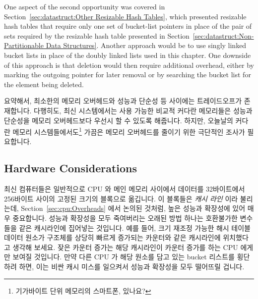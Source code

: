 One aspect of the second opportunity was covered in
Section~\ref{sec:datastruct:Other Resizable Hash Tables},
which presented resizable hash tables that require only one
set of bucket-list pointers in place of the pair of sets required
by the resizable hash table presented in
Section~\ref{sec:datastruct:Non-Partitionable Data Structures}.
Another approach would be to use singly linked bucket lists in
place of the doubly linked lists used in this chapter.
One downside of this approach is that deletion would then require
additional overhead, either by marking the outgoing pointer
for later removal
or by searching the bucket list for the element being deleted.
\fi

요약해서, 최소한의 메모리 오버헤드와 성능과 단순성 등 사이에는 트레이드오프가
존재합니다.
다행히도, 최신 시스템에서는 사용 가능한 비교적 커다란 메모리들은 성능과
단순성을 메모리 오버헤드보다 우선시 할 수 있도록 해줍니다.
하지만, 오늘날의 커다란 메모리 시스템들에서도\footnote{
	기가바이트 단위 메모리의 스마트폰, 있나요?}
가끔은 메모리 오버헤드를 줄이기 위한 극단적인 조사가 필요합니다.

\subsection{Hardware Considerations}
\label{sec:datastruct:Hardware Considerations}

최신 컴퓨터들은 일반적으로 CPU 와 메인 메모리 사이에서 데이터를 32바이트에서
256바이트 사이의 고정된 크기의 블록으로 옮깁니다.
이 블록들은 \emph{캐시 라인} 이라 불리는데,
Section~\ref{sec:cpu:Overheads} 에서 논의된 것처럼, 높은 성능과 확장성에 있어
매우 중요합니다.
성능과 확장성을 모두 죽여버리는 오래된 방법 하나는 호환불가한 변수들을 같은
캐시라인에 집어넣는 것입니다.
예를 들어, 크기 재조정 가능한 해시 테이블 데이터 원소가  구조체를
상당히 빠르게 증가되는 카운터와 같은 캐시라인에 위치했다고 생각해 보세요.
잦은 카운터 증가는 해당 캐시라인이 카운터 증가를 하는 CPU 에게만 보여질
것입니다.
만약 다른 CPU 가 해당 원소를 담고 있는 bucket 리스트를 횡단하려 하면, 이는 비싼
캐시 미스를 일으켜서 성능과 확장성을 모두 떨어뜨릴 겁니다.
\iffalse

